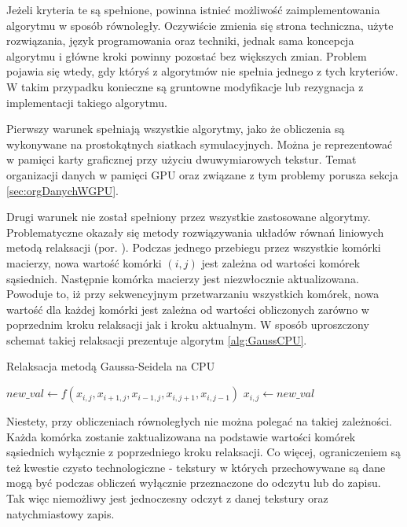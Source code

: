 Jeżeli kryteria te są spełnione, powinna istnieć możliwość zaimplementowania
algorytmu w sposób równoległy. Oczywiście zmienia się strona techniczna, użyte
rozwiązania, język programowania oraz techniki, jednak sama koncepcja
algorytmu i główne kroki powinny pozostać bez większych zmian. Problem pojawia
się wtedy, gdy któryś z algorytmów nie spełnia jednego z tych kryteriów. W
takim przypadku konieczne są gruntowne modyfikacje lub rezygnacja z
implementacji takiego algorytmu.

Pierwszy warunek spełniają wszystkie algorytmy, jako że obliczenia są wykonywane
na prostokątnych siatkach symulacyjnych. Można je reprezentować w pamięci karty
graficznej przy użyciu dwuwymiarowych tekstur. Temat organizacji danych w
pamięci GPU oraz związane z tym problemy porusza sekcja \ref{sec:orgDanychWGPU}.

Drugi warunek nie został spełniony przez wszystkie zastosowane algorytmy.
Problematyczne okazały się metody rozwiązywania układów równań liniowych metodą
relaksacji  (por. \cite{GaussSeidel}). Podczas jednego
przebiegu przez wszystkie komórki macierzy, nowa wartość komórki $(i, j)$ jest
zależna od wartości komórek sąsiednich. Następnie komórka macierzy jest
niezwłocznie aktualizowana. Powoduje to, iż przy sekwencyjnym przetwarzaniu
wszystkich komórek, nowa wartość dla każdej komórki jest zależna od wartości
obliczonych zarówno w poprzednim kroku relaksacji jak i kroku aktualnym. W
sposób uproszczony schemat takiej relaksacji prezentuje algorytm
\ref{alg:GaussCPU}.

\begin{algorithm}[H]
  \caption{Relaksacja metodą Gaussa-Seidela na CPU}
  \label{alg:GaussCPU}
\begin{algorithmic}
    \State $new\_val\gets f(x_{i,j}, x_{i+1,j}, x_{i-1,j}, x_{i,j+1}, x_{i,j-1})$
    \State $x_{i,j}\gets new\_val$
  \EndFor
\EndFor
\end{algorithmic}
\end{algorithm}

Niestety, przy obliczeniach równoległych nie można polegać na takiej zależności.
Każda komórka zostanie zaktualizowana na podstawie wartości komórek sąsiednich
wyłącznie z poprzedniego kroku relaksacji. Co więcej, ograniczeniem są też
kwestie czysto technologiczne - tekstury w których przechowywane są dane mogą
być podczas obliczeń wyłącznie przeznaczone do odczytu lub do zapisu. Tak więc
niemożliwy jest jednoczesny odczyt z danej tekstury oraz natychmiastowy zapis.

